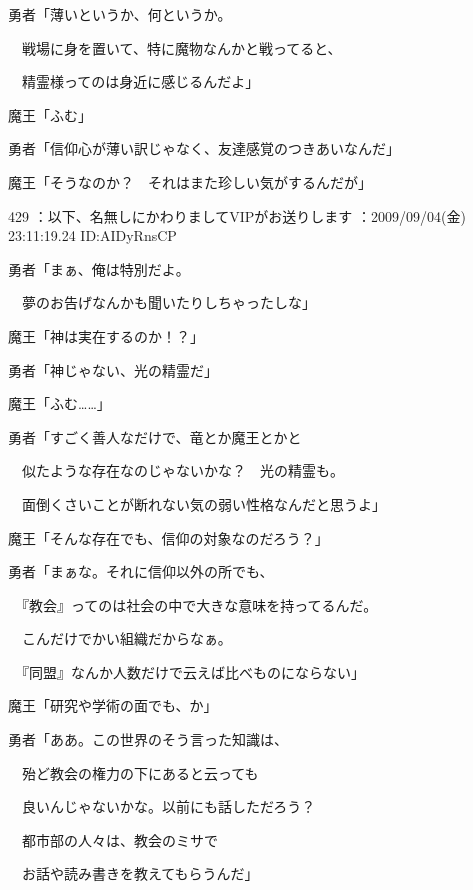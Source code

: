 \documentclass[a4j,twocolumn]{tarticle}
\begin{document}
勇者「薄いというか、何というか。\par{} 
　戦場に身を置いて、特に魔物なんかと戦ってると、\par{} 
　精霊様ってのは身近に感じるんだよ」\par{} 
魔王「ふむ」 



勇者「信仰心が薄い訳じゃなく、友達感覚のつきあいなんだ」\par{} 
魔王「そうなのか？　それはまた珍しい気がするんだが」 

	
    
    

429 ：以下、名無しにかわりましてVIPがお送りします ：2009/09/04(金) 23:11:19.24 ID:AIDyRnsCP 


勇者「まぁ、俺は特別だよ。\par{} 
　夢のお告げなんかも聞いたりしちゃったしな」\par{} 
魔王「神は実在するのか！？」 



勇者「神じゃない、光の精霊だ」\par{} 
魔王「ふむ……」 



勇者「すごく善人なだけで、竜とか魔王とかと\par{} 
　似たような存在なのじゃないかな？　光の精霊も。\par{} 
　面倒くさいことが断れない気の弱い性格なんだと思うよ」 



魔王「そんな存在でも、信仰の対象なのだろう？」 



勇者「まぁな。それに信仰以外の所でも、\par{} 
　『教会』ってのは社会の中で大きな意味を持ってるんだ。\par{} 
　こんだけでかい組織だからなぁ。\par{} 
　『同盟』なんか人数だけで云えば比べものにならない」 



魔王「研究や学術の面でも、か」 



勇者「ああ。この世界のそう言った知識は、\par{} 
　殆ど教会の権力の下にあると云っても\par{} 
　良いんじゃないかな。以前にも話しただろう？\par{} 
　都市部の人々は、教会のミサで\par{} 
　お話や読み書きを教えてもらうんだ」 
\end{document}
